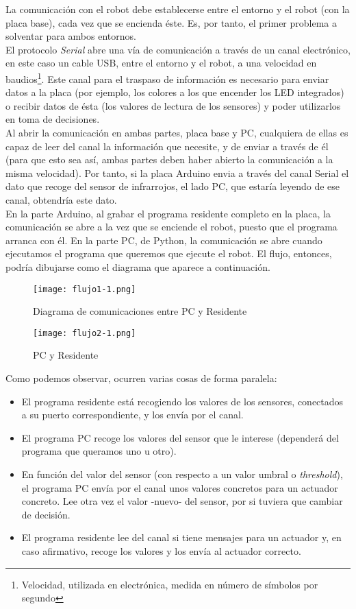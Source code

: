 La comunicación con el robot debe establecerse entre el entorno y el robot (con la placa base), cada vez que se encienda éste. Es, por tanto, el primer problema a solventar para ambos entornos. \\ 
El protocolo \textit{Serial} abre una vía de comunicación a través de un canal electrónico, en este caso un cable USB, entre el entorno y el robot, a una velocidad en baudios\footnote{Velocidad, utilizada en electrónica, medida en número de símbolos por segundo}. Este canal para el traspaso de información es necesario para enviar datos a la placa (por ejemplo, los colores a los que encender los LED integrados) o recibir datos de ésta (los valores de lectura de los sensores) y poder utilizarlos en toma de decisiones. \\
Al abrir la comunicación en ambas partes, placa base y PC, cualquiera de ellas es capaz de leer del canal la información que necesite, y de enviar a través de él (para que esto sea así, ambas partes deben haber abierto la comunicación a la misma velocidad). Por tanto, si la placa Arduino envia a través del canal Serial el dato que recoge del sensor de infrarrojos, el lado PC, que estaría leyendo de ese canal, obtendría este dato. \\
En la parte Arduino, al grabar el programa residente completo en la placa, la comunicación se abre a la vez que se enciende el robot, puesto que el programa arranca con él. En la parte PC, de Python, la comunicación se abre cuando ejecutamos el programa que queremos que ejecute el robot. El flujo, entonces, podría dibujarse como el diagrama que aparece a continuación.
\begin{figure}[h]
	\texttt{[image: flujo1-1.png]}
	\centering
	\label{img:FlujoComunicaciones}
	\caption{Diagrama de comunicaciones entre PC y Residente}
\end{figure}

\begin{figure}[h]
	\texttt{[image: flujo2-1.png]}
	\centering
	\label{img:FlujoComunicaciones2}
	\caption{PC y Residente}
\end{figure}

Como podemos observar, ocurren varias cosas de forma paralela:
\begin{itemize}
	\item El programa residente está recogiendo los valores de los sensores, conectados a su puerto correspondiente, y los envía por el canal.
	\item El programa PC recoge los valores del sensor que le interese (dependerá del programa que queramos uno u otro).
	\item En función del valor del sensor (con respecto a un valor umbral o \textit{threshold}), el programa PC envía por el canal unos valores concretos para un actuador concreto. Lee otra vez el valor -nuevo- del sensor, por si tuviera que cambiar de decisión.
	\item El programa residente lee del canal si tiene mensajes para un actuador y, en caso afirmativo, recoge los valores y los envía al actuador correcto.
\end{itemize}

